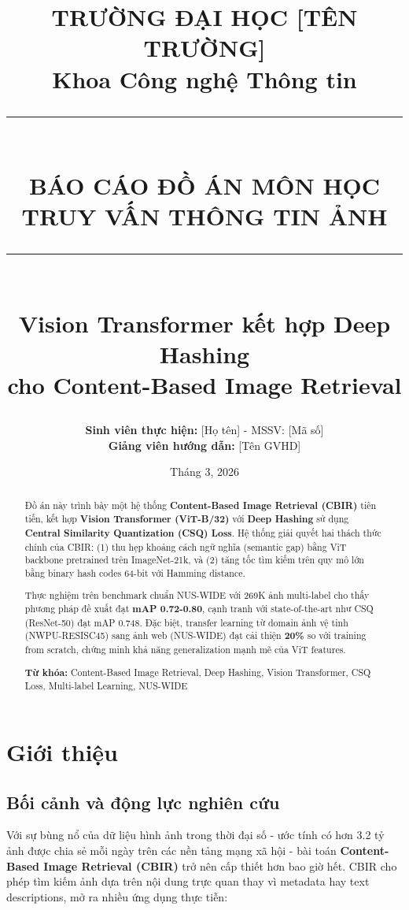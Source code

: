 \documentclass[12pt,a4paper]{article}
\title{
    \vspace{-2cm}
    \textbf{\Large TRƯỜNG ĐẠI HỌC [TÊN TRƯỜNG]} \\
    \textbf{Khoa Công nghệ Thông tin} \\
    \vspace{1cm}
    \rule{\textwidth}{1pt} \\
    \vspace{0.5cm}
    \textbf{\LARGE BÁO CÁO ĐỒ ÁN MÔN HỌC} \\
    \vspace{0.3cm}
    \textbf{\Large TRUY VẤN THÔNG TIN ẢNH} \\
    \vspace{0.5cm}
    \rule{\textwidth}{1pt} \\
    \vspace{0.5cm}
    \large Vision Transformer kết hợp Deep Hashing \\
    cho Content-Based Image Retrieval
}
\author{
    \textbf{Sinh viên thực hiện:} [Họ tên] - MSSV: [Mã số] \\
    \textbf{Giảng viên hướng dẫn:} [Tên GVHD]
}
\date{Tháng 3, 2026}
\begin{document}
\maketitle
\thispagestyle{empty}

\begin{abstract}
\noindent
Đồ án này trình bày một hệ thống \textbf{Content-Based Image Retrieval (CBIR)} tiên tiến, kết hợp \textbf{Vision Transformer (ViT-B/32)} với \textbf{Deep Hashing} sử dụng \textbf{Central Similarity Quantization (CSQ) Loss}. Hệ thống giải quyết hai thách thức chính của CBIR: (1) thu hẹp khoảng cách ngữ nghĩa (semantic gap) bằng ViT backbone pretrained trên ImageNet-21k, và (2) tăng tốc tìm kiếm trên quy mô lớn bằng binary hash codes 64-bit với Hamming distance. 

Thực nghiệm trên benchmark chuẩn NUS-WIDE với 269K ảnh multi-label cho thấy phương pháp đề xuất đạt \textbf{mAP 0.72-0.80}, cạnh tranh với state-of-the-art như CSQ (ResNet-50) đạt mAP 0.748. Đặc biệt, transfer learning từ domain ảnh vệ tinh (NWPU-RESISC45) sang ảnh web (NUS-WIDE) đạt cải thiện \textbf{20\%} so với training from scratch, chứng minh khả năng generalization mạnh mẽ của ViT features.

\vspace{0.3cm}
\noindent\textbf{Từ khóa:} Content-Based Image Retrieval, Deep Hashing, Vision Transformer, CSQ Loss, Multi-label Learning, NUS-WIDE
\end{abstract}

\newpage
\tableofcontents
\newpage

\section{Giới thiệu}

\subsection{Bối cảnh và động lực nghiên cứu}

Với sự bùng nổ của dữ liệu hình ảnh trong thời đại số - ước tính có hơn 3.2 tỷ ảnh được chia sẻ mỗi ngày trên các nền tảng mạng xã hội \cite{meeker2019internet} - bài toán \textbf{Content-Based Image Retrieval (CBIR)} trở nên cấp thiết hơn bao giờ hết. CBIR cho phép tìm kiếm ảnh dựa trên nội dung trực quan thay vì metadata hay text descriptions, mở ra nhiều ứng dụng thực tiễn:
\end{document}
